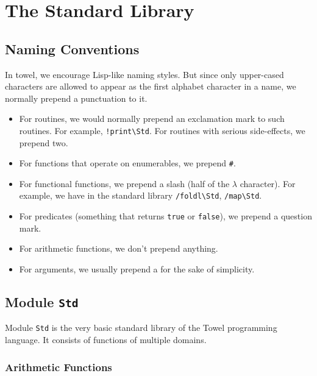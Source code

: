 \documentclass{report}
\newcommand{\mstd}[1]{\texttt{#1\textbackslash Std}}
\newcommand{\mtilde}[1]{\textasciitilde}
\begin{document}
\chapter{The Standard Library}

\section{Naming Conventions}

In towel, we encourage Lisp-like naming styles. But since only upper-cased characters are allowed to appear as the first alphabet character in a name, we normally prepend a punctuation to it.

\begin{itemize}
\item For routines, we would normally prepend an exclamation mark to
  such routines. For example, \mstd{!print}. For routines with serious side-effects, we prepend two.

\item For functions that operate on enumerables, we prepend \texttt{\#}.

\item For functional functions, we prepend a slash (half of the $\lambda$ character). For example, we have in the standard library \mstd{/foldl}, \mstd{/map}.

\item For predicates (something that returns \texttt{true} or \texttt{false}), we prepend a question mark.

\item For arithmetic functions, we don't prepend anything.

\item For arguments, we usually prepend a \texttt{\mtilde} for the sake of simplicity.
\end{itemize}

\section{Module \texttt{Std}}

Module \texttt{Std} is the very basic standard library of the Towel programming language. It consists of functions of multiple domains.

\subsection{Arithmetic Functions}
\end{document}
